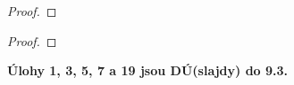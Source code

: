 \documentclass[../main.tex]{subfiles}
\begin{document}
\begin{example}
\end{example}

\begin{lemma}
\end{lemma}
\begin{proof}
\end{proof}

\begin{definition}
\end{definition}

\begin{definition}
\end{definition}

\begin{lemma}[o $|\cdot|_p$]
\end{lemma}
\begin{proof}
\end{proof}

\vspace{3mm}
\noindent
\textbf{Úlohy 1, 3, 5, 7 a 19 jsou DÚ(slajdy) do 9.3.}
\end{document}
